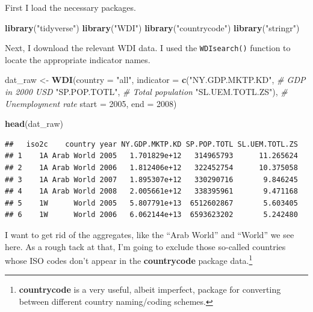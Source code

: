 \documentclass[12pt,oneside,openany]{book}
\newenvironment{Shaded}{\begin{snugshade}}{\end{snugshade}}
\newcommand{\KeywordTok}[1]{\textcolor[rgb]{0.13,0.29,0.53}{\textbf{#1}}}
\newcommand{\DataTypeTok}[1]{\textcolor[rgb]{0.13,0.29,0.53}{#1}}
\newcommand{\DecValTok}[1]{\textcolor[rgb]{0.00,0.00,0.81}{#1}}
\newcommand{\StringTok}[1]{\textcolor[rgb]{0.31,0.60,0.02}{#1}}
\newcommand{\CommentTok}[1]{\textcolor[rgb]{0.56,0.35,0.01}{\textit{#1}}}
\newcommand{\NormalTok}[1]{#1}
\begin{document}
First I load the necessary packages.

\begin{Shaded}
\begin{Highlighting}[]
\KeywordTok{library}\NormalTok{(}\StringTok{"tidyverse"}\NormalTok{)}
\KeywordTok{library}\NormalTok{(}\StringTok{"WDI"}\NormalTok{)}
\KeywordTok{library}\NormalTok{(}\StringTok{"countrycode"}\NormalTok{)}
\KeywordTok{library}\NormalTok{(}\StringTok{"stringr"}\NormalTok{)}
\end{Highlighting}
\end{Shaded}

Next, I download the relevant WDI data. I used the \texttt{WDIsearch()}
function to locate the appropriate indicator names.

\begin{Shaded}
\begin{Highlighting}[]
\NormalTok{dat_raw <-}\StringTok{ }\KeywordTok{WDI}\NormalTok{(}\DataTypeTok{country =} \StringTok{"all"}\NormalTok{,}
               \DataTypeTok{indicator =} \KeywordTok{c}\NormalTok{(}\StringTok{"NY.GDP.MKTP.KD"}\NormalTok{,  }\CommentTok{# GDP in 2000 USD}
                             \StringTok{"SP.POP.TOTL"}\NormalTok{,     }\CommentTok{# Total population}
                             \StringTok{"SL.UEM.TOTL.ZS"}\NormalTok{), }\CommentTok{# Unemployment rate}
               \DataTypeTok{start =} \DecValTok{2005}\NormalTok{,}
               \DataTypeTok{end =} \DecValTok{2008}\NormalTok{)}

\KeywordTok{head}\NormalTok{(dat_raw)}
\end{Highlighting}
\end{Shaded}

\begin{verbatim}
##   iso2c    country year NY.GDP.MKTP.KD SP.POP.TOTL SL.UEM.TOTL.ZS
## 1    1A Arab World 2005   1.701829e+12   314965793      11.265624
## 2    1A Arab World 2006   1.812406e+12   322452754      10.375058
## 3    1A Arab World 2007   1.895307e+12   330290716       9.846245
## 4    1A Arab World 2008   2.005661e+12   338395961       9.471168
## 5    1W      World 2005   5.807791e+13  6512602867       5.603405
## 6    1W      World 2006   6.062144e+13  6593623202       5.242480
\end{verbatim}

I want to get rid of the aggregates, like the ``Arab World'' and
``World'' we see here. As a rough tack at that, I'm going to exclude
those so-called countries whose ISO codes don't appear in the
\textbf{countrycode} package data.\footnote{\textbf{countrycode} is a
  very useful, albeit imperfect, package for converting between
  different country naming/coding schemes.}
\end{document}
